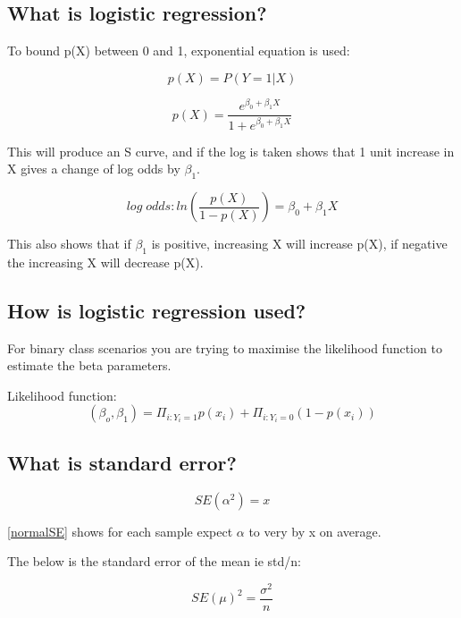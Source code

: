 \documentclass[11pt]{scrartcl} %
\begin{document}
\subsection{What is logistic regression?}

To bound p(X) between 0 and 1, exponential equation is used:

\begin{equation}
	p(X) = P(Y=1|X)
\end{equation}

\begin{equation}
	p(X) = \frac{e^{\beta_0 + \beta_1X}}{1+e^{\beta_0 + \beta_1X}}
\end{equation}

This will produce an S curve, and if the log is taken shows that 1 unit increase in X gives a change of log odds by 
\( \beta_1\).

\begin{equation}
	log\; odds: ln(\frac{p(X)}{1-p(X)}) = \beta_0 + \beta_1X
\end{equation}

This also shows that if \(\beta_1\) is positive, increasing X will increase p(X), if negative the increasing X will
decrease p(X).

\subsection{How is logistic regression used?}

For binary class scenarios you are trying to maximise the likelihood function to estimate the beta parameters.

Likelihood function:
\begin{equation}
	(\beta_o,\beta_1) = \Pi_{i:Y_i=1}p(x_i) + \Pi_{i:Y_i=0}(1-p(x_i))
\end{equation}

\subsection{What is standard error?}

\begin{equation}
	SE(\alpha^2) = x
	\label{normalSE}
\end{equation}

\ref{normalSE} shows for each sample expect \(\alpha\) to very by x on average.

The below is the standard error of the mean ie std/n:

\begin{equation}
	SE(\mu)^2 = \frac{\sigma^2}{n}
\end{equation}
\end{document}

